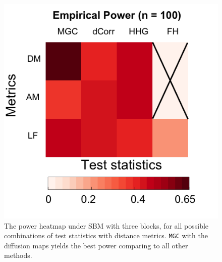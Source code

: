 \documentclass[11pt]{article}
\theoremstyle{definition}
\begin{document}
\begin{figure}
	\centering
	\includegraphics[width=0.4\paperwidth, height=0.4\paperwidth]{ThreeSBM_results_short.png}
	\caption{The power heatmap under SBM with three blocks, for all possible combinations of test statistics with distance metrics. \texttt{MGC} with the diffusion maps yields the best power comparing to all other methods. }
	\label{fig:threeSBM}
\end{figure}
\end{document}
